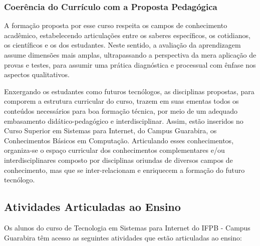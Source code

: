 \subsubsection{Coerência do Currículo com a Proposta Pedagógica}

A formação proposta por esse curso respeita os campos de conhecimento acadêmico, estabelecendo articulações entre os saberes específicos, os cotidianos, os científicos e os dos estudantes.  Neste sentido, a avaliação da aprendizagem assume dimensões mais amplas, ultrapassando a perspectiva da mera aplicação de provas e testes, para assumir uma prática diagnóstica e processual com ênfase nos aspectos qualitativos.

Enxergando os estudantes como futuros tecnólogos, as disciplinas propostas, para comporem a estrutura curricular do curso, trazem em suas ementas todos os conteúdos necessários para boa formação técnica, por meio de um adequado embasamento didático-pedagógico e interdisciplinar. Assim, estão inseridos no Curso Superior em Sistemas para Internet, do Campus Guarabira, os Conhecimentos Básicos em Computação. Articulando esses conhecimentos, organiza-se o espaço curricular dos conhecimentos complementares e/ou interdisciplinares composto por disciplinas oriundas de diversos campos de conhecimento, mas que se inter-relacionam e enriquecem a formação do futuro tecnólogo.

\subsection{Atividades Articuladas ao Ensino}

 Os alunos do curso de Tecnologia em Sistemas para Internet do IFPB - Campus Guarabira têm acesso as seguintes atividades que estão articuladas ao ensino:

